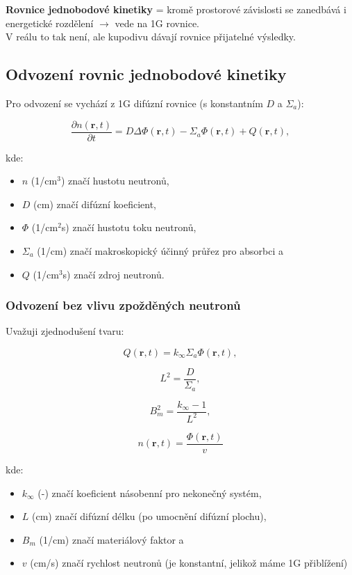 \textbf{Rovnice jednobodové kinetiky} = kromě prostorové závislosti se zanedbává i energetické rozdělení $\rightarrow$ vede na 1G rovnice.\\

V reálu to tak není, ale kupodivu dávají rovnice přijatelné výsledky.

\subsection{Odvození rovnic jednobodové kinetiky}

Pro odvození se vychází z 1G difúzní rovnice (s konstantním $D$ a $\Sigma_a$):

\begin{equation}
  \boxed{
  \dfrac{\partial n(\textbf{r}, t)}{\partial t} = D \Delta \Phi (\textbf{r}, t) - \Sigma_a \Phi (\textbf{r}, t) + Q (\textbf{r}, t),
  \label{difuzka}}
\end{equation}

kde:

\begin{itemize}
  \item $n$ (1/cm$^3$) značí hustotu neutronů,
  \item $D$ (cm) značí difúzní koeficient,
  \item $\Phi$ (1/cm$^2$s) značí hustotu toku neutronů,
  \item $\Sigma_a$ (1/cm) značí makroskopický účinný průřez pro absorbci a
  \item $Q$ (1/cm$^3$s) značí zdroj neutronů.
\end{itemize}

\subsubsection{Odvození bez vlivu zpožděných neutronů}

Uvažuji zjednodušení tvaru:

$$ Q (\textbf{r}, t) = k_\infty \Sigma_a \Phi (\textbf{r}, t), $$

$$ L^2 = \dfrac{D}{\Sigma_a}, $$

$$ B_m^2 = \dfrac{k_\infty - 1}{L^2}, $$

$$ n(\textbf{r}, t) = \dfrac{\Phi (\textbf{r}, t)}{v}$$

kde:

\begin{itemize}
  \item $k_\infty$ (-) značí koeficient násobenní pro nekonečný systém,
  \item $L$ (cm) značí difúzní délku (po umocnění difúzní plochu),
  \item $B_m$ (1/cm) značí materiálový faktor a
  \item $v$ (cm/s) značí rychlost neutronů (je konstantní, jelikož máme 1G přiblížení)
\end{itemize}

